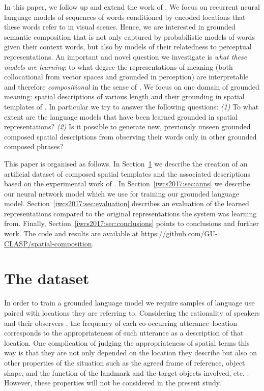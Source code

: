 In this paper, we follow up and extend the work of \cite{monroe2016learning}.
We focus on recurrent neural language models of sequences of words conditioned by encoded locations
that these words refer to in visual scenes. Hence, we are interested in
grounded semantic composition that is not only captured by probabilistic models of words
given their context words, but also by models of their relatedness to
perceptual representations. An important and novel question we investigate is
\emph{what these models are learning}: to what degree the representations of
meaning (both collocational from vector spaces and grounded in perception) are
interpretable and therefore \emph{compositional} in the sense of
\cite{Montague1974}. We focus on one domain of grounded meaning: spatial
descriptions of various length and their grounding in spatial templates of
\cite{logan1996computational}. In particular we try to answer the following questions:
\textit{(1)} To what extent are the language models that have been learned grounded in
spatial representations?
\textit{(2)} Is it possible to generate new, previously unseen grounded composed
spatial descriptions from observing their words only in other grounded composed
phrases?

This paper is organised as follows. In Section~\ref{iwcs2017:sec:dataset} we describe the
creation of an artificial dataset of composed spatial templates and the
associated descriptions based on the experimental work of
\cite{logan1996computational}. In Section~\ref{iwcs2017:sec:anns} we describe our neural
network model which we use for training our grounded language model.
Section~\ref{iwcs2017:sec:evaluation} describes an evaluation of the learned
representations compared to the original representations the system was learning
from. Finally, Section~\ref{iwcs2017:sec:conclusions} points to conclusions and further
work. The code and results are available at
\url{https://github.com/GU-CLASP/spatial-composition}.

\section{The dataset}\label{iwcs2017:sec:dataset}
In order to train a grounded language model we require samples of language use
paired with locations they are referring to. Considering the rationality of
speakers and their observers \cite{Grice:1975aa}, the frequency of each
co-occurring utterance--location corresponds to the appropriateness of such
utterance as a description of that location. One complication of judging
the appropriateness of spatial terms this way is that they are not only depended on the
location they describe but also on other properties of the situation such as the
agreed frame of reference, object shape, and the function of the landmark and
the target objects involved, etc. \cite{herskovits1986language,Dobnik:2016ad}. However, these properties will not be
considered in the present study.

